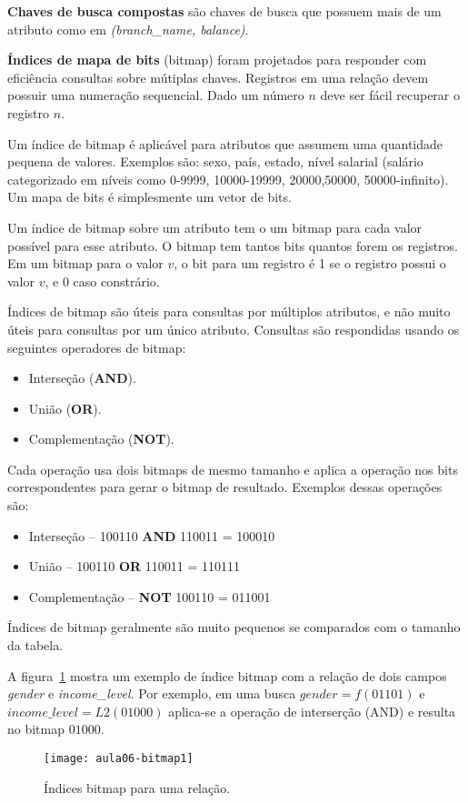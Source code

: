 \textbf{Chaves de busca compostas} são chaves de busca que possuem
mais de um atributo como em \emph{(branch\_name, balance)}.

\textbf{Índices de mapa de bits} (bitmap) foram projetados para responder com
eficiência consultas sobre mútiplas chaves.
Registros em uma relação devem possuir uma numeração sequencial. 
Dado um número $n$ deve ser fácil recuperar o registro $n$.

Um índice de bitmap é aplicável para atributos que assumem uma quantidade pequena de valores.
Exemplos são: sexo, país, estado, nível salarial (salário categorizado em níveis como 
0-9999, 10000-19999, 20000,50000, 50000-infinito).
Um mapa de bits é simplesmente um vetor de bits.

Um índice de bitmap sobre um atributo tem o um bitmap para cada valor possível
para esse atributo.
O bitmap tem tantos bits quantos forem os registros. 
Em um bitmap para o valor $v$, o bit para um registro é 1 se o 
registro possui o valor $v$, e 0 caso constrário.

Índices de bitmap são úteis para consultas por múltiplos atributos, e não muito úteis
para consultas por um único atributo.
Consultas são respondidas usando os seguintes operadores de bitmap:
\begin{itemize}
\item Interseção (\textbf{AND}).
\item União (\textbf{OR}).
\item Complementação (\textbf{NOT}).
\end{itemize}
Cada operação usa dois bitmaps de mesmo tamanho e aplica a operação nos bits
correspondentes para gerar o bitmap de resultado. Exemplos dessas operações são:
\begin{itemize}
\item Interseção -- 100110 \textbf{AND} 110011 = 100010
\item União --      100110 \textbf{OR} 110011 = 110111
\item Complementação -- \textbf{NOT} 100110 = 011001
\end{itemize}
Índices de bitmap geralmente são muito pequenos se comparados com o tamanho da tabela.

A figura~\ref{aula06:fig:bitmap1} mostra um exemplo de índice bitmap com a relação
de dois campos \emph{gender} e \emph{income\_level}. 
Por exemplo, em uma busca $gender = f(01101)$ e $income\_level = L2(01000)$ aplica-se a 
operação de interserção (AND) e resulta no bitmap $01000$.
%
\begin{figure}[!htb]
\centering
\texttt{[image: aula06-bitmap1]}
\caption{Índices bitmap para uma relação.}
\label{aula06:fig:bitmap1}
\end{figure}

